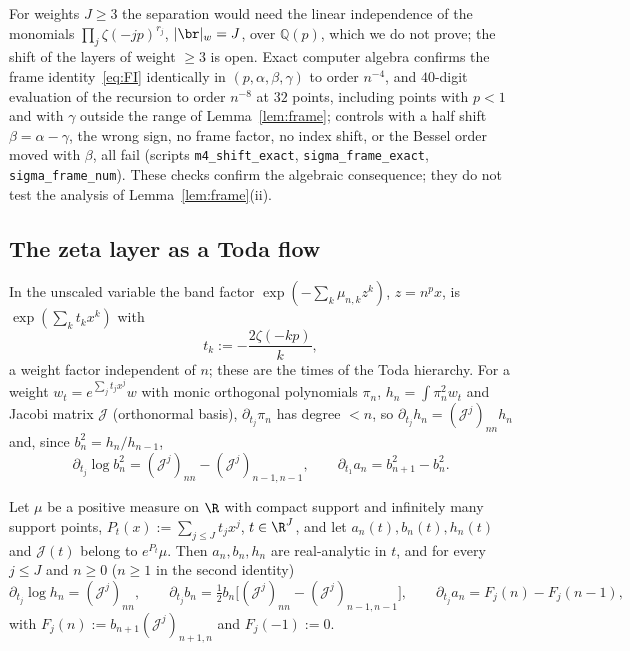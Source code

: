 For weights $J\ge3$ the separation would need the linear independence of the monomials $\prod_j\zeta(-jp)^{r_j}$, $|\br|_w=J$, over
$\mathbb Q(p)$, which we do not prove; the shift of the layers of weight $\ge3$ is open. Exact computer algebra confirms the frame
identity~\eqref{eq:FI} identically in $(p,\alpha,\beta,\gamma)$ to order $n^{-4}$, and $40$-digit evaluation of the recursion to order
$n^{-8}$ at $32$ points, including points with $p<1$ and with $\gamma$ outside the range of Lemma~\ref{lem:frame}; controls with a
half shift $\beta=\alpha-\gamma$, the wrong sign, no frame factor, no index shift, or the Bessel order moved with $\beta$, all fail
(scripts \texttt{m4\_shift\_exact}, \texttt{sigma\_frame\_exact}, \texttt{sigma\_frame\_num}). These checks confirm the algebraic
consequence; they do not test the analysis of Lemma~\ref{lem:frame}(ii).

\subsection{The zeta layer as a Toda flow}\label{sec:toda}
In the unscaled variable the band factor $\exp(-\sum_k\mu_{n,k}z^k)$, $z=n^px$, is $\exp(\sum_kt_kx^k)$ with
\begin{equation}\label{eq:todatimes}
  t_k:=-\frac{2\zeta(-kp)}k ,
\end{equation}
a weight factor independent of $n$; these are the times of the Toda hierarchy. For a weight $w_t=e^{\sum_jt_jx^j}w$ with monic
orthogonal polynomials $\pi_n$, $h_n=\int\pi_n^2w_t$ and Jacobi matrix $\mathcal J$ (orthonormal basis), $\partial_{t_j}\pi_n$ has degree
$<n$, so $\partial_{t_j}h_n=(\mathcal J^j)_{nn}h_n$ and, since $b_n^2=h_n/h_{n-1}$,
\begin{equation}\label{eq:toda}
  \partial_{t_j}\log b_n^2=(\mathcal J^j)_{nn}-(\mathcal J^j)_{n-1,n-1},\qquad \partial_{t_1}a_n=b_{n+1}^2-b_n^2 .
\end{equation}

\begin{lemma}\label{lem:todatilt}
Let $\mu$ be a positive measure on $\R$ with compact support and infinitely many support points, $P_t(x):=\sum_{j\le J}t_jx^j$,
$t\in\R^J$, and let $a_n(t),b_n(t),h_n(t)$ and $\mathcal J(t)$ belong to $e^{P_t}\mu$. Then $a_n,b_n,h_n$ are real-analytic in $t$, and
for every $j\le J$ and $n\ge0$ ($n\ge1$ in the second identity)
\[
  \partial_{t_j}\log h_n=(\mathcal J^j)_{nn},\qquad
  \partial_{t_j}b_n=\tfrac12b_n\bigl[(\mathcal J^j)_{nn}-(\mathcal J^j)_{n-1,n-1}\bigr],\qquad
  \partial_{t_j}a_n=F_j(n)-F_j(n-1),
\]
with $F_j(n):=b_{n+1}(\mathcal J^j)_{n+1,n}$ and $F_j(-1):=0$.
\end{lemma}

